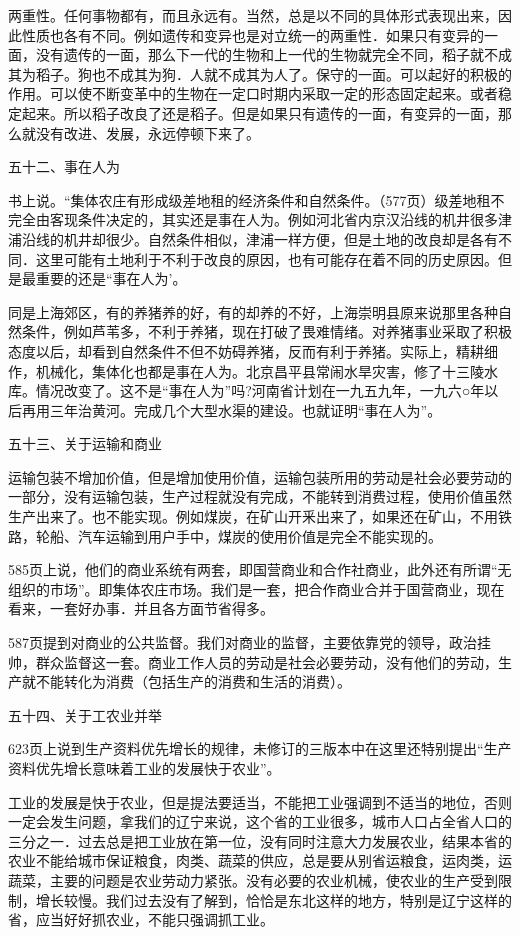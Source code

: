 两重性。任何事物都有，而且永远有。当然，总是以不同的具体形式表现出来，因此性质也各有不同。例如遗传和变异也是对立统一的两重性．如果只有变异的一面，没有遗传的一面，那么下一代的生物和上一代的生物就完全不同，稻子就不成其为稻子。狗也不成其为狗．人就不成其为人了。保守的一面。可以起好的积极的作用。可以使不断变革中的生物在一定口时期内采取一定的形态固定起来。或者稳定起来。所以稻子改良了还是稻子。但是如果只有遗传的一面，有变异的一面，那么就没有改进、发展，永远停顿下来了。

五十二、事在人为

书上说。“集体农庄有形成级差地租的经济条件和自然条件。（577页）级差地租不完全由客现条件决定的，其实还是事在人为。例如河北省内京汉沿线的机井很多津浦沿线的机井却很少。自然条件相似，津浦一样方便，但是土地的改良却是各有不同．这里可能有土地利于不利于改良的原因，也有可能存在着不同的历史原因。但是最重要的还是“事在人为’。

同是上海郊区，有的养猪养的好，有的却养的不好，上海崇明县原来说那里各种自然条件，例如芦苇多，不利于养猪，现在打破了畏难情绪。对养猪事业采取了积极态度以后，却看到自然条件不但不妨碍养猪，反而有利于养猪。实际上，精耕细作，机械化，集体化也都是事在人为。北京昌平县常闹水旱灾害，修了十三陵水库。情况改变了。这不是“事在人为”吗?河南省计划在一九五九年，一九六○年以后再用三年治黄河。完成几个大型水渠的建设。也就证明“事在人为”。

五十三、关于运输和商业

运输包装不增加价值，但是增加使用价值，运输包装所用的劳动是社会必要劳动的一部分，没有运输包装，生产过程就没有完成，不能转到消费过程，使用价值虽然生产出来了。也不能实现。例如煤炭，在矿山开釆出来了，如果还在矿山，不用铁路，轮船、汽车运输到用户手中，煤炭的使用价值是完全不能实现的。

585页上说，他们的商业系统有两套，即国营商业和合作社商业，此外还有所谓“无组织的市场”。即集体农庄市场。我们是一套，把合作商业合并于国营商业，现在看来，一套好办事．并且各方面节省得多。

587页提到对商业的公共监督。我们对商业的监督，主要依靠党的领导，政治挂帅，群众监督这一套。商业工作人员的劳动是社会必要劳动，没有他们的劳动，生产就不能转化为消费（包括生产的消费和生活的消费）。

五十四、关于工农业并举

623页上说到生产资料优先增长的规律，未修订的三版本中在这里还特别提出“生产资料优先增长意味着工业的发展快于农业”。

工业的发展是快于农业，但是提法要适当，不能把工业强调到不适当的地位，否则一定会发生问题，拿我们的辽宁来说，这个省的工业很多，城市人口占全省人口的三分之一．过去总是把工业放在第一位，没有同时注意大力发展农业，结果本省的农业不能给城市保证粮食，肉类、蔬菜的供应，总是要从别省运粮食，运肉类，运蔬菜，主要的问题是农业劳动力紧张。没有必要的农业机械，使农业的生产受到限制，增长较慢。我们过去没有了解到，恰恰是东北这样的地方，特别是辽宁这样的省，应当好好抓农业，不能只强调抓工业。

